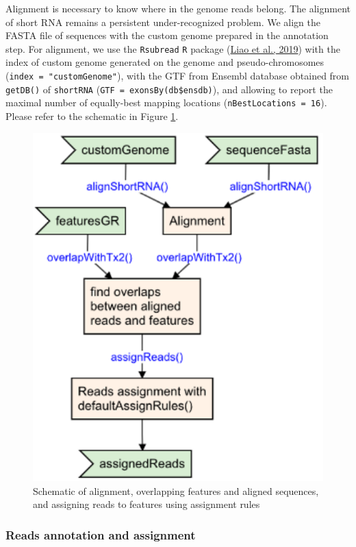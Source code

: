 \documentclass[12pt,twoside]{reedthesis}
\begin{document}
Alignment is necessary to know where in the genome reads belong. The
alignment of short RNA remains a persistent under-recognized problem. We
align the FASTA file of sequences with the custom genome prepared in the
annotation step. For alignment, we use the \texttt{Rsubread} \texttt{R} package
(\protect\hyperlink{ref-liao2019}{Liao et al., 2019}) with the index of custom genome generated on the genome and
pseudo-chromosomes (\texttt{index\ =\ "customGenome"}), with the GTF from Ensembl
database obtained from \texttt{getDB()} of \texttt{shortRNA} (\texttt{GTF\ =\ exonsBy(db\$ensdb)}),
and allowing to report the maximal number of equally-best mapping
locations (\texttt{nBestLocations\ =\ 16}). Please refer to the schematic in Figure
\ref{fig:3f7}.


\begin{figure}[htbp]

{\centering \includegraphics{thesis_files/figure-latex/3f7-1} 

}

\caption{Schematic of alignment, overlapping features and aligned sequences, and assigning reads to features using assignment rules}\label{fig:3f7}
\end{figure}
\hypertarget{reads-annotation-and-assignment}{%
\subsubsection{Reads annotation and assignment}\label{reads-annotation-and-assignment}}
\end{document}
